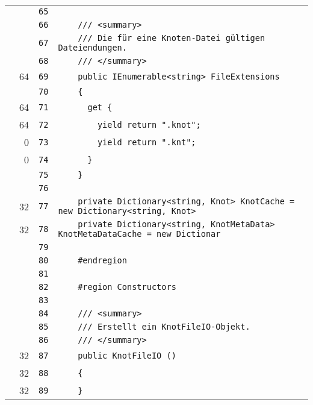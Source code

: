 \documentclass[a4paper,10pt]{article}
\begin{document}
\begin{longtable}[l]{lrrl}
\cellcolor{gray} &  & \verb~65~ & \verb~~\\
\cellcolor{gray} &  & \verb~66~ & \verb~    /// <summary>~\\
\cellcolor{gray} &  & \verb~67~ & \verb~    /// Die für eine Knoten-Datei gültigen Dateiendungen.~\\
\cellcolor{gray} &  & \verb~68~ & \verb~    /// </summary>~\\
\cellcolor{green} & 64 & \verb~69~ & \verb~    public IEnumerable<string> FileExtensions~\\
\cellcolor{gray} &  & \verb~70~ & \verb~    {~\\
\cellcolor{green} & 64 & \verb~71~ & \verb~      get {~\\
\cellcolor{green} & 64 & \verb~72~ & \verb~        yield return ".knot";~\\
\cellcolor{red} & 0 & \verb~73~ & \verb~        yield return ".knt";~\\
\cellcolor{red} & 0 & \verb~74~ & \verb~      }~\\
\cellcolor{gray} &  & \verb~75~ & \verb~    }~\\
\cellcolor{gray} &  & \verb~76~ & \verb~~\\
\cellcolor{green} & 32 & \verb~77~ & \verb~    private Dictionary<string, Knot> KnotCache = new Dictionary<string, Knot> ~\\
\cellcolor{green} & 32 & \verb~78~ & \verb~    private Dictionary<string, KnotMetaData> KnotMetaDataCache = new Dictionar~\\
\cellcolor{gray} &  & \verb~79~ & \verb~~\\
\cellcolor{gray} &  & \verb~80~ & \verb~    #endregion~\\
\cellcolor{gray} &  & \verb~81~ & \verb~~\\
\cellcolor{gray} &  & \verb~82~ & \verb~    #region Constructors~\\
\cellcolor{gray} &  & \verb~83~ & \verb~~\\
\cellcolor{gray} &  & \verb~84~ & \verb~    /// <summary>~\\
\cellcolor{gray} &  & \verb~85~ & \verb~    /// Erstellt ein KnotFileIO-Objekt.~\\
\cellcolor{gray} &  & \verb~86~ & \verb~    /// </summary>~\\
\cellcolor{green} & 32 & \verb~87~ & \verb~    public KnotFileIO ()~\\
\cellcolor{green} & 32 & \verb~88~ & \verb~    {~\\
\cellcolor{green} & 32 & \verb~89~ & \verb~    }~\\

\end{longtable}
\end{document}
